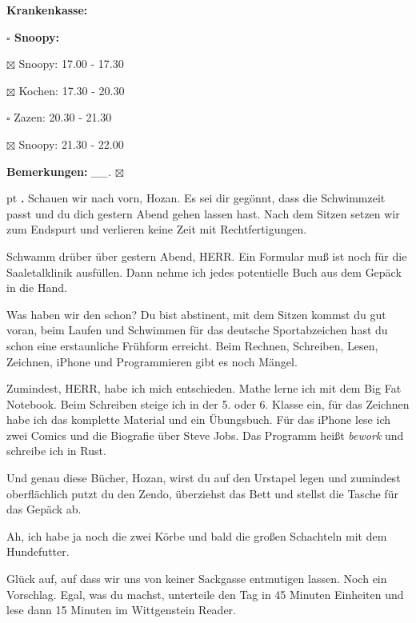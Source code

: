\documentclass[10pt,a4paper]{article}
\newcounter{notec}
\newcommand\notep[1]{%
  \stepcounter{notec}
  \vskip #1pt
  {\bf\arabic{notec}.}
}
\newcommand\prop[1] {{\color {alizarin} {\bf #1}}}             %
\newcommand\mand[1] {{\color {burntorange} {\bf #1}}}          %
\newcommand\bottomspace{\vskip 4pt}
\newcommand\n[1] { {\sl #1.} \hskip 5pt }
\begin{document}
\begin{mdframed}[style=daystyle]
\begin{labeling}{{\mand {Krankenkasse:}}}
\begin{minipage}{0.75\textwidth}
\begin{labeling}{\prop {$\square$ {Snoopy:}}}
        
      \item[$\boxtimes$ Snoopy:] 17.00 - 17.30
      \item[$\boxtimes$ Kochen:] 17.30 - 20.30
        
      \item[$\square$ Zazen:]  20.30 - 21.30
      \item[$\boxtimes$ Snoopy:] 21.30 - 22.00
      \end{labeling}
    \end{minipage}
    \bottomspace
  \item[{\mand {Bemerkungen:}}]  \n{\_\_} $\boxtimes$
  \end{labeling}
    
  \setcounter{notec}{0}
  
  \notep 0 Schauen wir nach vorn, Hozan. Es sei dir gegönnt, dass die
  Schwimmzeit passt und du dich gestern Abend gehen lassen hast. Nach dem Sitzen
  setzen wir zum Endspurt und verlieren keine Zeit mit Rechtfertigungen.

  \vskip 2pt
  Schwamm drüber über gestern Abend, HERR. Ein Formular muß ist noch für die
  Saaletalklinik ausfüllen. Dann nehme ich jedes potentielle Buch aus dem Gepäck
  in die Hand.

  \vskip 2pt
  Was haben wir den schon? Du bist abstinent, mit dem Sitzen kommst du gut
  voran, beim Laufen und Schwimmen für das deutsche Sportabzeichen hast du schon
  eine erstaunliche Frühform erreicht. Beim Rechnen, Schreiben, Lesen, Zeichnen,
  iPhone und Programmieren gibt es noch Mängel.

  \vskip 2pt  
  Zumindest, HERR, habe ich mich entschieden. Mathe lerne ich mit dem Big Fat
  Notebook. Beim Schreiben steige ich in der 5. oder 6. Klasse ein, für das
  Zeichnen habe ich das komplette Material und ein Übungsbuch. Für das iPhone
  lese ich zwei Comics und die Biografie über Steve Jobs. Das Programm heißt
  {\it bework} und schreibe ich in Rust.

  \vskip 2pt
  Und genau diese Bücher, Hozan, wirst du auf den Urstapel legen und zumindest
  oberflächlich putzt du den Zendo, überziehst das Bett und stellst die Tasche
  für das Gepäck ab.

  \vskip 2pt
  Ah, ich habe ja noch die zwei Körbe und bald die großen Schachteln mit dem
  Hundefutter.

  \vskip 2pt
  Glück auf, auf dass wir uns von keiner Sackgasse entmutigen lassen. Noch ein
  Vorschlag. Egal, was du machst, unterteile den Tag in 45 Minuten Einheiten und
  lese dann 15 Minuten im Wittgenstein Reader.


\end{mdframed}
\end{document}
